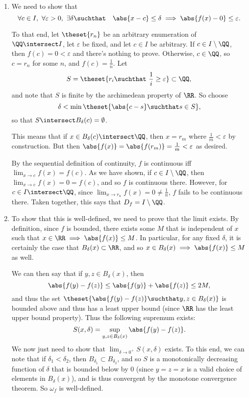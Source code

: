 \begin{solution}\hfill
\begin{enumerate}
  \item We need to show that
    $$
    \forall c\in I, ~\forall\varepsilon > 0, ~\exists \delta \suchthat \quad \abs{x-c} \leq \delta \implies \abs{f(x) - 0} \leq \varepsilon.
    $$

    To that end, let $\theset{r_n}$ be an arbitrary enumeration of $\QQ \intersect I$, let $\varepsilon$ be fixed, and let $c \in I$ be arbitrary. If $c\in I\setminus\QQ$, then $f(c) = 0 < \varepsilon$ and there's nothing to prove. Otherwise, $c\in\QQ$, so $c = r_n$ for some $n$, and $f(c) = \frac 1 n$. Let
    $$
    S = \theset{r_i \suchthat ~ \frac 1 i \geq \varepsilon} \subset \QQ,
    $$
    and note that $S$ is finite by the archimedean property of $\RR$. So choose
    $$
    \delta < \min\theset{\abs{c - s} \suchthat s\in S},
    $$
    so that $S \intersect B_\delta(c) = \emptyset$.

    This means that if $x\in B_\delta(c) \intersect \QQ$, then $x = r_m$ where $\frac 1 m < \varepsilon$ by construction. But then $\abs{f(x)} = \abs{f(r_m)} = \frac 1 m < \varepsilon$ as desired.

    By the sequential definition of continuity, $f$ is continuous iff $\lim_{x\to c} f(x) = f(c)$. As we have shown, if $c\in I\setminus\QQ$, then $\lim_{x\to c}f(x) = 0 = f(c)$, and so $f$ is continuous there. However, for $c\in I\intersect \QQ$, since $\lim_{x\to r_n} f(x) = 0 \neq \frac 1 n$, $f$ fails to be continuous there. Taken together, this says that $D_f = I\setminus \QQ$.

  \item To show that this is well-defined, we need to prove that the limit exists. By definition, since $f$ is bounded, there exists some $M$ that is independent of $x$ such that $x\in \RR \implies \abs{f(x)} \leq M$. In particular, for any fixed $\delta$, it is certainly the case that $B_\delta(x) \subset \RR$, and so $x\in B_\delta(x) \implies \abs{f(x)} \leq M$ as well.

    We can then say that if $y,z \in B_\delta(x)$, then
    $$
    \abs{f(y) - f(z)} \leq \abs{f(y)} + \abs{f(z)} \leq 2M,
    $$
    and thus the set $\theset{\abs{f(y) - f(z)} \suchthat y,z \in B_\delta(x)}$ is bounded above and thus has a least upper bound (since $\RR$ has the least upper bound property). Thus the following supremum exists:
    $$
    S(x, \delta) = \sup_{y,z \in B_\delta(x)} \abs{f(y) - f(z)}.
    $$
    We now just need to show that $\lim_{\delta \to 0^+} S(x, \delta)$ exists. To this end, we can note that if $\delta_1 < \delta_2$, then $B_{\delta_1} \subset B_{\delta_2}$, and so $S$ is a monotonically decreasing function of $\delta$ that is bounded below by 0 (since $y=z=x$ is a valid choice of elements in $B_\delta(x)$), and is thus convergent by the monotone convergence theorem. So $\omega_f$ is well-defined.


\end{enumerate}
\end{solution}
